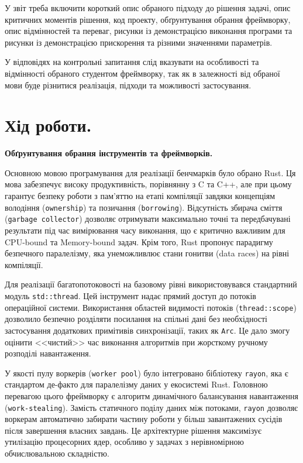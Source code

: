 \documentclass[14pt, a4paper]{extreport}
\begin{document}
	У звіт треба включити короткий опис обраного підходу до рішення задачі, опис критичних моментів рішення, код проекту, обґрунтування обрання фреймворку, опис відмінностей та переваг, рисунки із демонстрацією виконання програми та рисунки із демонстрацією прискорення та різними значеннями параметрів.
	
	У відповідях на контрольні запитання слід вказувати на особливості та відмінності обраного студентом фреймворку, так як в залежності від обраної мови буде різнитися реалізація, підходи та можливості застосування.
	
	\section*{Хід роботи.}
	
	\textbf{Обґрунтування обрання інструментів та фреймворків.}
	
	Основною мовою програмування для реалізації бенчмарків було обрано Rust. Ця мова забезпечує високу продуктивність, порівнянну з C та C++, але при цьому гарантує безпеку роботи з пам'яттю на етапі компіляції завдяки концепціям володіння (\texttt{ownership}) та позичання (\texttt{borrowing}). Відсутність збирача сміття (\texttt{garbage collector}) дозволяє отримувати максимально точні та передбачувані результати під час вимірювання часу виконання, що є критично важливим для CPU-bound та Memory-bound задач. Крім того, Rust пропонує парадигму безпечного паралелізму, яка унеможливлює стани гонитви (data races) на рівні компіляції.
	
	Для реалізації багатопотоковості на базовому рівні використовувався стандартний модуль \texttt{std::thread}. Цей інструмент надає прямий доступ до потоків операційної системи. Використання областей видимості потоків (\texttt{thread::scope}) дозволило безпечно розділяти посилання на спільні дані без необхідності застосування додаткових примітивів синхронізації, таких як \texttt{Arc}. Це дало змогу оцінити <<чистий>> час виконання алгоритмів при жорсткому ручному розподілі навантаження.
	
	У якості пулу воркерів (\texttt{worker pool}) було інтегровано бібліотеку \texttt{rayon}, яка є стандартом де-факто для паралелізму даних у екосистемі Rust. Головною перевагою цього фреймворку є алгоритм динамічного балансування навантаження (\texttt{work-stealing}). Замість статичного поділу даних між потоками, \texttt{rayon} дозволяє воркерам автоматично забирати частину роботи у більш завантажених сусідів після завершення власних завдань. Це архітектурне рішення максимізує утилізацію процесорних ядер, особливо у задачах з нерівномірною обчислювальною складністю.
	
\end{document}
